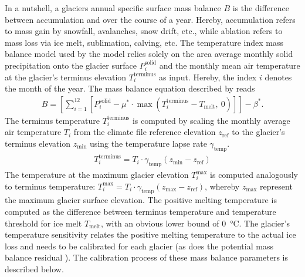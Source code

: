         In a nutshell, a glaciers annual specific surface mass balance $B$ is the difference between accumulation and over the course of a year. Hereby, accumulation refers to mass gain by snowfall, avalanches, snow drift, etc., while ablation refers to mass loss via ice melt, sublimation, calving, etc. The temperature index mass balance model used by the \vas{} model relies solely on the area average monthly solid precipitation onto the glacier surface $P_i^\text{solid}$ and the monthly mean air temperature at the glacier's terminus elevation $T_i^\text{terminus}$ as input. Hereby, the index $i$ denotes the month of the year. The mass balance equation described by \citet{Marzeion2012b} reads
        \begin{align}
            \label{eq:mass-balance}
            B = \left[\sum_{i=1}^{12}\left[
                    P_i^\text{solid}  - \mu^* \cdot \max\left(T_{i}^\text{terminus} - T_\text{melt},\ 0\right)
                \right]\right] - \beta^*.
        \end{align}
        The terminus temperature $T_{i}^\text{terminus}$ is computed by scaling the monthly average air temperature $T_i$ from the climate file reference elevation $z_\text{ref}$ to the glacier's terminus elevation $z_\text{min}$ using the temperature lapse rate $\gamma_\text{temp}$.
        \begin{align}
            T_i^\text{terminus} = T_i \cdot \gamma_\text{temp} (z_\text{min} - z_\text{ref})
        \end{align}
        The temperature at the maximum glacier elevation $T_{i}^\text{max}$ is computed analogously to terminus temperature: $T_{i}^\text{max} = T_i \cdot \gamma_\text{temp} (z_\text{max} - z_\text{ref})$, whereby $z_\text{max}$ represent the maximum glacier surface elevation. The positive melting temperature is computed as the difference between terminus temperature and temperature threshold for ice melt $T_\text{melt}$, with an obvious lower bound of \SI{0}{\celsius}. The glacier's temperature sensitivity \mustar{} relates the positive melting temperature to the actual ice loss and needs to be calibrated for each glacier (as does the potential mass balance residual \bias{}). The calibration process of these mass balance parameters is described below. %
        
